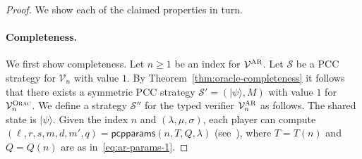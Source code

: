 \documentclass[11pt]{article}
\theoremstyle{definition}
\newcommand{\ket}[1]{|#1\rangle}
\newcommand{\verifier}{\mathcal{V}}
\newcommand{\strategy}{\mathscr{S}}
\newcommand{\gamestyle}[1]{\ensuremath{\textsc{#1}}\xspace}
\newcommand{\ora}{\gamestyle{Orac}}
\newcommand{\ar}{\gamestyle{AR}}
\newcommand{\pcpparams}{\mathsf{pcpparams}}
\newcommand{\qlen}{Q}
\begin{document}
\begin{proof}
  We show each of the claimed properties in turn.

  \paragraph{Completeness.}
  We first show completeness.
  Let $n\geq 1$ be an index for $\verifier^\ar$.
  Let $\strategy$ be a PCC strategy for $\verifier_n$ with value $1$.
  By Theorem~\ref{thm:oracle-completeness} it follows that there exists a
  symmetric PCC strategy $\strategy' = (\ket{\psi}, M)$ with value $1$ for
  $\verifier^\ora_n$.
  We define a strategy $\strategy''$ for the typed verifier $\verifier_n^\ar$ as
  follows.
  The shared state is $\ket{\psi}$.
  Given the index $n$ and $(\lambda,\mu,\sigma)$, each player can compute
  $(\ell, r, s, m ,d, m',q) = \pcpparams(n, T, \qlen,\lambda)$
  (see~), where $T=T(n)$ and $Q=Q(n)$ are as
  in~\eqref{eq:ar-params-1}.


\end{proof}
\end{document}

